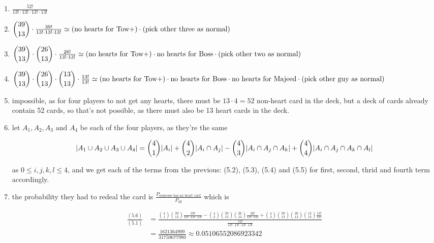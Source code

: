 \medskip
\solution

\begin{enumerate}
    \item $\frac{52!}{13! \cdot 13! \cdot 13! \cdot 13!}$
    \item $\dbinom{39}{13} \cdot \frac{39!}{13! \cdot 13! \cdot 13!} \simeq \text{(no hearts for Tow+)} \cdot \text{(pick other three as normal)}$ 
    \item $\dbinom{39}{13} \cdot \dbinom{26}{13} \cdot \frac{26!}{13! \cdot 13!} \simeq \text{(no hearts for Tow+)} \cdot \text{no hearts for Boss} \cdot \text{(pick other two as normal)}$ 
    \item $\dbinom{39}{13} \cdot \dbinom{26}{13} \cdot \dbinom{13}{13} \cdot \frac{13!}{13!} \simeq \text{(no hearts for Tow+)} \cdot \text{no hearts for Boss} \cdot \text{no hearts for Majeed} \cdot \text{(pick other guy as normal)}$ 
    \item impossible, as for four players to not get any hearts, there must be $13 \cdot 4 = 52$ non-heart card in the deck, but a deck of cards already contain 52 cards, so that's not possible, as there must also be 13 heart cards in the deck. 
    \item let $A_1, A_2, A_3 \text{ and } A_4$ be each of the four players, as they're the same

        \[
            |A_1 \cup A_2 \cup A_3 \cup A_4| = \dbinom{4}{1}|A_i| + \dbinom{4}{2}|A_i \cap A_j| - \dbinom{4}{3}|A_i \cap A_j \cap A_k| + \dbinom{4}{4}{|A_i \cap A_j \cap A_k \cap A_l|}
        \]

        as $0 \le i, j, k, l \le 4$, and we get each of the terms from the previous: (5.2), (5.3), (5.4) and (5.5) for first, second, thrid and fourth term accordingly. 

    \item the probability they had to redeal the card is $\frac{P_{\text{someone has no heart card}}}{P_{\text{all}}}$ which is

        \begin{align*}
            \frac{(5.6)}{(5.1)} &= \frac{\binom{4}{1}\binom{39}{13}\frac{39!}{13!\cdot13!
        \cdot13!} - \binom{4}{2}\binom{39}{13}\binom{26}{13}\frac{26!}{13!\cdot13!}
        + \binom{4}{3}\binom{39}{13}\binom{26}{13}\binom{13}{13}\frac{13!}{13!}}
        {\frac{52!}{13!\cdot13!\cdot13!\cdot13!}} \\
        &= \frac{1621364909}{31750677980} \approx \boxed{0.05106552086923342}
        \end{align*}

\end{enumerate}

